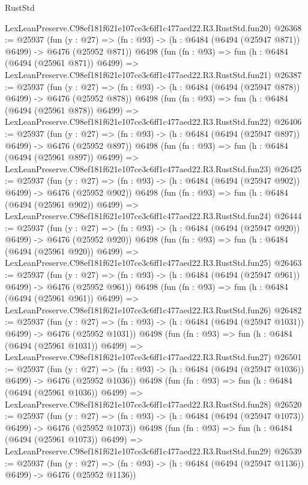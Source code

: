 \begin{lexlean}{RustStd}
\begin{coremodule}
    LexLeanPreserve.C98ef181f621e107ce3c6ff1c477aed22.R3.RustStd.fun20)
@26368 := @25937
    (fun (y : @27) => (fn : @93) -> (h : @6484 (@6494 (@25947 @871)) @6499) -> @6476 (@25952 @871))
    @6498
    (fun (fn : @93) =>
    fun (h : @6484 (@6494 (@25961 @871)) @6499) =>
    LexLeanPreserve.C98ef181f621e107ce3c6ff1c477aed22.R3.RustStd.fun21)
@26387 := @25937
    (fun (y : @27) => (fn : @93) -> (h : @6484 (@6494 (@25947 @878)) @6499) -> @6476 (@25952 @878))
    @6498
    (fun (fn : @93) =>
    fun (h : @6484 (@6494 (@25961 @878)) @6499) =>
    LexLeanPreserve.C98ef181f621e107ce3c6ff1c477aed22.R3.RustStd.fun22)
@26406 := @25937
    (fun (y : @27) => (fn : @93) -> (h : @6484 (@6494 (@25947 @897)) @6499) -> @6476 (@25952 @897))
    @6498
    (fun (fn : @93) =>
    fun (h : @6484 (@6494 (@25961 @897)) @6499) =>
    LexLeanPreserve.C98ef181f621e107ce3c6ff1c477aed22.R3.RustStd.fun23)
@26425 := @25937
    (fun (y : @27) => (fn : @93) -> (h : @6484 (@6494 (@25947 @902)) @6499) -> @6476 (@25952 @902))
    @6498
    (fun (fn : @93) =>
    fun (h : @6484 (@6494 (@25961 @902)) @6499) =>
    LexLeanPreserve.C98ef181f621e107ce3c6ff1c477aed22.R3.RustStd.fun24)
@26444 := @25937
    (fun (y : @27) => (fn : @93) -> (h : @6484 (@6494 (@25947 @920)) @6499) -> @6476 (@25952 @920))
    @6498
    (fun (fn : @93) =>
    fun (h : @6484 (@6494 (@25961 @920)) @6499) =>
    LexLeanPreserve.C98ef181f621e107ce3c6ff1c477aed22.R3.RustStd.fun25)
@26463 := @25937
    (fun (y : @27) => (fn : @93) -> (h : @6484 (@6494 (@25947 @961)) @6499) -> @6476 (@25952 @961))
    @6498
    (fun (fn : @93) =>
    fun (h : @6484 (@6494 (@25961 @961)) @6499) =>
    LexLeanPreserve.C98ef181f621e107ce3c6ff1c477aed22.R3.RustStd.fun26)
@26482 := @25937
    (fun (y : @27) =>
    (fn : @93) -> (h : @6484 (@6494 (@25947 @1031)) @6499) -> @6476 (@25952 @1031))
    @6498
    (fun (fn : @93) =>
    fun (h : @6484 (@6494 (@25961 @1031)) @6499) =>
    LexLeanPreserve.C98ef181f621e107ce3c6ff1c477aed22.R3.RustStd.fun27)
@26501 := @25937
    (fun (y : @27) =>
    (fn : @93) -> (h : @6484 (@6494 (@25947 @1036)) @6499) -> @6476 (@25952 @1036))
    @6498
    (fun (fn : @93) =>
    fun (h : @6484 (@6494 (@25961 @1036)) @6499) =>
    LexLeanPreserve.C98ef181f621e107ce3c6ff1c477aed22.R3.RustStd.fun28)
@26520 := @25937
    (fun (y : @27) =>
    (fn : @93) -> (h : @6484 (@6494 (@25947 @1073)) @6499) -> @6476 (@25952 @1073))
    @6498
    (fun (fn : @93) =>
    fun (h : @6484 (@6494 (@25961 @1073)) @6499) =>
    LexLeanPreserve.C98ef181f621e107ce3c6ff1c477aed22.R3.RustStd.fun29)
@26539 := @25937
    (fun (y : @27) =>
    (fn : @93) -> (h : @6484 (@6494 (@25947 @1136)) @6499) -> @6476 (@25952 @1136))

\end{coremodule}
\end{lexlean}
